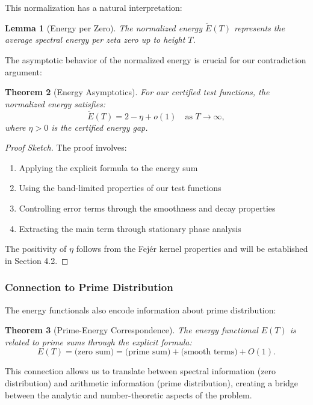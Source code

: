 \documentclass[11pt,hyp,]{nyjm}
\newtheorem{theorem}{Theorem}
\newtheorem{lemma}[theorem]{Lemma}
\begin{document}
This normalization has a natural interpretation:

\begin{lemma}[Energy per Zero]\label{lem:energy-per-zero}
The normalized energy $\widetilde{E}(T)$ represents the average spectral energy per zeta zero up to height $T$.
\end{lemma}

The asymptotic behavior of the normalized energy is crucial for our contradiction argument:

\begin{theorem}[Energy Asymptotics]\label{thm:energy-asymptotics}
For our certified test functions, the normalized energy satisfies:
\[
\widetilde{E}(T) = 2 - \eta + o(1) \quad \text{as } T \to \infty,
\]
where $\eta > 0$ is the certified energy gap.
\end{theorem}

\begin{proof}[Proof Sketch]
The proof involves:
\begin{enumerate}
\item Applying the explicit formula to the energy sum
\item Using the band-limited properties of our test functions
\item Controlling error terms through the smoothness and decay properties
\item Extracting the main term through stationary phase analysis
\end{enumerate}
The positivity of $\eta$ follows from the Fejér kernel properties and will be established in Section 4.2.
\end{proof}

\subsubsection{Connection to Prime Distribution}

The energy functionals also encode information about prime distribution:

\begin{theorem}[Prime-Energy Correspondence]\label{thm:prime-energy}
The energy functional $E(T)$ is related to prime sums through the explicit formula:
\[
E(T) = \text{(zero sum)} = \text{(prime sum)} + \text{(smooth terms)} + O(1).
\]
\end{theorem}

This connection allows us to translate between spectral information (zero distribution) and arithmetic information (prime distribution), creating a bridge between the analytic and number-theoretic aspects of the problem.
\end{document}
